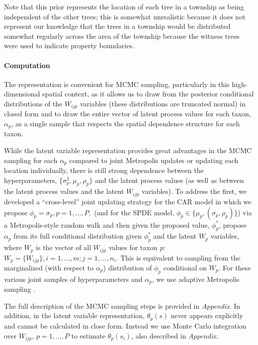 \documentclass[10pt,letterpaper]{article}
\begin{document}
Note that this prior represents the location of each tree in a township
as being independent of the other trees; this is somewhat unrealistic
because it does not represent our knowledge that the trees in a township
would be distributed somewhat regularly across the area of the township
because the witness trees were used to indicate property boundaries.


\paragraph*{Computation}

The \cite{McCu:Ross:1994} representation is convenient for MCMC sampling,
particularly in this high-dimensional spatial context, as it allows
us to draw from the posterior conditional distributions of the $W_{ijp}$
variables (these distributions are truncated normal) in closed form
and to draw the entire vector of latent process values for each taxon,
$\alpha_{p}$, as a single sample that respects the spatial dependence
structure for each taxon.

While the latent variable representation provides great advantages
in the MCMC sampling for each $\alpha_{p}$ compared to joint Metropolis
updates or updating each location individually, there is still strong
dependence between the hyperparameters, $\{\sigma_{p}^{2},\mu_{p},\rho_{p}\}$
and the latent process values (as well as between the latent process
values and the latent $W_{ijp}$ variables). To address the first,
we developed a ``cross-level'' joint updating strategy for the CAR
model in which we propose $\phi_{p}=\sigma_{p},p=1,\ldots,P,$ (and
for the SPDE model, $\phi_{p}\in\{\mu_{p},(\sigma_{p},\rho_{p})\}$)
via a Metropolis-style random walk and then given the proposed value,
$\phi_{p}^{*}$, propose $\alpha_{p}$ from its full conditional distribution
given $\phi_{p}^{*}$ and the latent $W_{p}$ variables, where $W_{p}$
is the vector of all $W_{ijp}$ values for taxon \emph{p}: $W_{p}=\{W_{ijp}\},i=1,\ldots,m;j=1,\ldots,n_{i}$.
This is equivalent to sampling from the marginalized (with respect
to $\alpha_{p}$) distribution of $\phi_{p}$ conditional on $W_{p}$.
For these various joint samples of hyperparameters and $\alpha_{p}$,
we use adaptive Metropolis sampling \cite{Shab:Well:2011}.

The full description of the MCMC sampling steps is provided in \emph{Appendix}. In addition, in the latent variable representation, $\theta_{p}(s)$
never appears explicitly and cannot be calculated in close form. Instead
we use Monte Carlo integration over $W_{ijp},\, p=1,\ldots,P$ to
estimate $\theta_{p}(s_{i})$, also described in \emph{Appendix}. 
\end{document}
